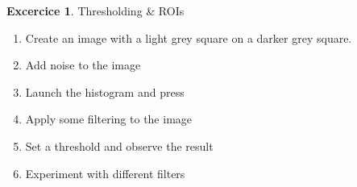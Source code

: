 \documentclass[xcolor=table]{scrartcl}
\theoremstyle{definition}
\newtheorem{exercice}{Excercice}
\begin{document}
\begin{exercice} Thresholding \& ROIs
  \begin{enumerate}
     \item Create an image with a light grey square on a darker grey
      square.
    \item Add noise to the image
    \item Launch the histogram and press 
    \item Apply some filtering to the image
    \item Set a threshold and observe the result
    \item  Experiment with different filters
  \end{enumerate}
\end{exercice}
\end{document}
